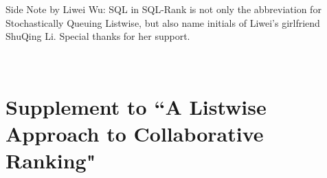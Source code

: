 \documentclass{article}
\begin{document}
Side Note by Liwei Wu: SQL in SQL-Rank is not only the abbreviation for Stochastically Queuing Listwise, but also name initials of Liwei's girlfriend ShuQing Li. Special thanks for her support. 









\newpage~\newpage
\appendix
\section{Supplement to ``A Listwise Approach to Collaborative Ranking"}



\end{document}
